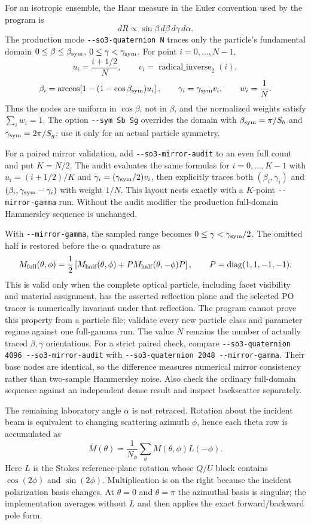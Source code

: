 \documentclass[
  10pt,
  a4paper,
]{article}
\begin{document}
For an isotropic ensemble, the Haar measure in the Euler convention used by
the program is
\[
 dR \mathrel{\propto} \sin\beta\,d\beta\,d\gamma\,d\alpha.
\]
The production mode \texttt{-\/-so3-quaternion N} traces only the particle's
fundamental domain
$0\leq\beta\leq\beta_{\rm sym}$,
$0\leq\gamma<\gamma_{\rm sym}$.  For point $i=0,\ldots,N-1$,
\[
 u_i=\frac{i+1/2}{N},\qquad
 v_i=\operatorname{radical\_inverse}_2(i),
\]
\[
 \beta_i=\arccos\!\left[1-(1-\cos\beta_{\rm sym})u_i\right],\qquad
 \gamma_i=\gamma_{\rm sym}v_i,\qquad w_i=\frac1N.
\]
Thus the nodes are uniform in $\cos\beta$, not in $\beta$, and the normalized
weights satisfy $\sum_i w_i=1$.  The option \texttt{-\/-sym Sb Sg} overrides
the domain with $\beta_{\rm sym}=\pi/S_b$ and
$\gamma_{\rm sym}=2\pi/S_g$; use it only for an actual particle symmetry.

For a paired mirror validation, add \texttt{-\/-so3-mirror-audit} to an even
full count and put $K=N/2$. The audit evaluates the same formulas for
$i=0,\ldots,K-1$ with $u_i=(i+1/2)/K$ and
$\gamma_i=(\gamma_{\rm sym}/2)v_i$, then explicitly traces both
$(\beta_i,\gamma_i)$ and $(\beta_i,\gamma_{\rm sym}-\gamma_i)$ with weight
$1/N$. This layout nests exactly with a $K$-point
\texttt{-\/-mirror-gamma} run. Without the audit modifier the production
full-domain Hammersley sequence is unchanged.

With \texttt{-\/-mirror-gamma}, the sampled range becomes
$0\leq\gamma<\gamma_{\rm sym}/2$. The omitted half is restored before the
$\alpha$ quadrature as
\[
 M_{\rm full}(\theta,\phi)=\frac12\left[
 M_{\rm half}(\theta,\phi)+P M_{\rm half}(\theta,-\phi)P\right],\qquad
 P=\operatorname{diag}(1,1,-1,-1).
\]
This is valid only when the complete optical particle, including facet
visibility and material assignment, has the asserted reflection plane and the
selected PO tracer is numerically invariant under that reflection. The program
cannot prove this property from a particle file; validate every new particle
class and parameter regime against one full-gamma run. The value $N$ remains
the number of actually traced $\beta,\gamma$ orientations. For a strict paired
check, compare \texttt{-\/-so3-quaternion 4096 -\/-so3-mirror-audit} with
\texttt{-\/-so3-quaternion 2048 -\/-mirror-gamma}. Their base nodes are
identical, so the difference measures numerical mirror consistency rather than
two-sample Hammersley noise. Also check the ordinary full-domain sequence
against an independent dense result and inspect backscatter separately.

The remaining laboratory angle $\alpha$ is not retraced.  Rotation about the
incident beam is equivalent to changing scattering azimuth $\phi$, hence each
theta row is accumulated as
\[
 \overline{M}(\theta)=\frac{1}{N_\phi}
 \sum_{\phi} M(\theta,\phi)L(-\phi).
\]
Here $L$ is the Stokes reference-plane rotation whose $Q/U$ block contains
$\cos(2\phi)$ and $\sin(2\phi)$.  Multiplication is on the right because the
incident polarization basis changes.  At $\theta=0$ and $\theta=\pi$ the
azimuthal basis is singular; the implementation averages without $L$ and then
applies the exact forward/backward pole form.
\end{document}
